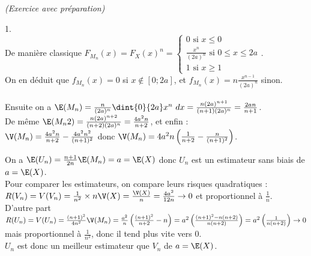 \documentclass[11pt]{article}%
\begin{document}
\begin{exercice}{\it (Exercice avec préparation)}
\begin{noliste}{1.}
\[\]
 De manière classique $F_{M_{n}} (x) = F_{X}(x)^{n} = \left\{
\begin{array}{cl}
 0 \text{ si } x \leq 0 \\
\frac{x^{n}}{(2a)^{n}} \text{ si } 0 \leq x \leq 2a \\
1 \text{ si } x \geq 1
\end{array}
\right.$. \\
 On en déduit que $f_{M_{n}} (x) = 0$ si $x \notin [ 0 ; 2a]$, et
$f_{M_{n}} (x) = n \frac{x^{n-1}}{(2a)^{n}}$ sinon. \\
\\
 Ensuite on a $\E(M_{n}) = \frac{n}{(2a)^{n}} \dint{0}{2a} x^{n}\ dx =
\frac{ n (2a)^{n + 1} }{ (n + 1) (2a)^{n}} = \frac{2a n}{n + 1}$. \\
 De même $\E(M_{n}{2}) = \frac{ n (2a)^{n + 2} }{(n + 2) (2a)^{n}} =
\frac{4 a^{2} n}{n + 2}$, et enfin : \\
 $\V(M_{n}) = \frac{4 a^{2} n}{n + 2} - \frac{4a^{2} n^{2}}{(n +
1)^{2}}$ donc $\V(M_{n}) = 4 a^{2} n \left( \frac{1}{n + 2} -
\frac{n}{(n + 1)^{2}} \right)$. \\
 \item On a $\E(U_{n}) = \frac{n + 1}{2n} \E(M_{n}) = a = \E(X)$ donc
$U_{n}$ est un estimateur sans biais de $a = \E(X)$. \\
 Pour comparer les estimateurs, on compare leurs risques quadratiques :
\\
 $R (V_{n}) = V (V_{n}) = \frac{1}{n^{2}} \times n \V(X) =
\frac{\V(X)}{n} = \frac{ 4 a^{2}}{12 n} \rightarrow 0$ et proportionnel
à $\frac{1}{n}$. \\
 D'autre part $R(U_{n}) = V ( U_{n}) = \frac{(n + 1)^{2}}{4 n^{2}}
\V(M_{n}) = \frac{a^{2}}{n} \left( \frac{(n + 1)^{2}}{n + 2} - n
\right) = a^{2} \left( \frac{(n + 1)^{2} - n (n + 2)}{n (n + 2)}
\right) = a^{2} \left( \frac{1}{n (n + 2)} \right) \rightarrow 0$ mais
proportionnel à $\frac{1}{n^{2}}$, donc il tend plus vite vers 0. \\
 $U_{n}$ est donc un meilleur estimateur que $V_{n}$ de $a = \E(X)$.
 \end{noliste}
 \end{exercice}

 \newpage

 
\end{document}
